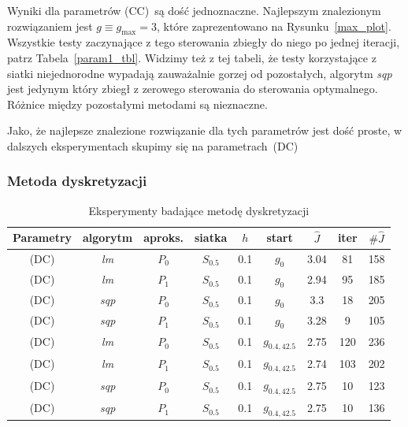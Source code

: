 \documentclass[11pt]{article}
\begin{document}
Wyniki dla parametrów (CC)\ są dość jednoznaczne. Najlepszym znalezionym rozwiązaniem jest $g \equiv g_{\max} = 3$, które zaprezentowano na Rysunku~\ref{max_plot}. Wszystkie testy zaczynające z tego sterowania zbiegły do niego po jednej iteracji, patrz Tabela~\ref{param1_tbl}. Widzimy też z tej tabeli, że testy korzystające z siatki niejednorodne wypadają zauważalnie gorzej od pozostałych, algorytm {\it sqp\/} jest jedynym który zbiegł z zerowego sterowania do sterowania optymalnego. Różnice między pozostałymi metodami są nieznaczne.

Jako, że najlepsze znalezione rozwiązanie dla tych parametrów jest dość proste, w dalszych eksperymentach skupimy się na parametrach~(DC)

\subsubsection{Metoda dyskretyzacji}

\begin{table}[h!]
  \begin{center}
    \begin{tabular}{|c|c|c|c|c|c|c|c|c|}
      \hline
      Parametry & algorytm & aproks. & siatka & $h$ & start & $\hat{J}$ & iter & $\#\hat{J}$ \\
      \hline
      (DC) & {\it lm\/} & $P_0$ & $S_{0.5}$ & 0.1 & $g_0$ & 3.04 & 81 & 158 \\
      \hline
      (DC) & {\it lm\/} & $P_1$ & $S_{0.5}$ & 0.1 & $g_0$ & 2.94 & 95 & 185 \\
      \hline
      (DC) & {\it sqp\/} & $P_0$ & $S_{0.5}$ & 0.1 & $g_0$ & 3.3 & 18 & 205 \\
      \hline
      (DC) & {\it sqp\/} & $P_1$ & $S_{0.5}$ & 0.1 & $g_0$ & 3.28 & 9 & 105 \\
      \hline
      (DC) & {\it lm\/} & $P_0$ & $S_{0.5}$ & 0.1 & $g_{0.4,42.5}$ & 2.75 & 120 & 236 \\
      \hline
      (DC) & {\it lm\/} & $P_1$ & $S_{0.5}$ & 0.1 & $g_{0.4,42.5}$ & 2.74 & 103 & 202 \\
      \hline
      (DC) & {\it sqp\/} & $P_0$ & $S_{0.5}$ & 0.1 & $g_{0.4,42.5}$ & 2.75 & 10 & 123 \\
      \hline
      (DC) & {\it sqp\/} & $P_1$ & $S_{0.5}$ & 0.1 & $g_{0.4,42.5}$ & 2.75 & 10 & 136 \\
      \hline
    \end{tabular}
    \caption{Eksperymenty badające metodę dyskretyzacji}\label{discr_tbl}
  \end{center}
\end{table}
\end{document}
